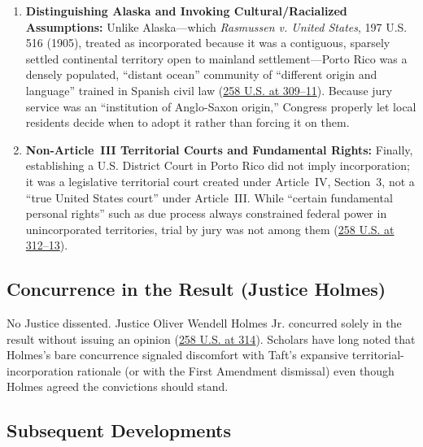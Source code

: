 \documentclass[12pt]{article}
\begin{document}
\begin{enumerate}
  \item \textbf{Distinguishing Alaska and Invoking Cultural/Racialized Assumptions:} Unlike Alaska---which \textit{Rasmussen v. United States}, 197 U.S. 516 (1905), treated as incorporated because it was a contiguous, sparsely settled continental territory open to mainland settlement---Porto Rico was a densely populated, ``distant ocean'' community of ``different origin and language'' trained in Spanish civil law (\href{https://en.wikisource.org/wiki/Balzac_v._Porto_Rico/Opinion_of_the_Court}{258 U.S. at 309--11}). Because jury service was an ``institution of Anglo-Saxon origin,'' Congress properly let local residents decide when to adopt it rather than forcing it on them.
  \item \textbf{Non-Article~III Territorial Courts and Fundamental Rights:} Finally, establishing a U.S. District Court in Porto Rico did not imply incorporation; it was a legislative territorial court created under Article~IV, Section~3, not a ``true United States court'' under Article~III. While ``certain fundamental personal rights'' such as due process always constrained federal power in unincorporated territories, trial by jury was not among them (\href{https://en.wikisource.org/wiki/Balzac_v._Porto_Rico/Opinion_of_the_Court}{258 U.S. at 312--13}).
\end{enumerate}

\subsection{Concurrence in the Result (Justice Holmes)}

No Justice dissented. Justice Oliver Wendell Holmes Jr. concurred solely in the result without issuing an opinion (\href{https://supreme.justia.com/cases/federal/us/258/298/}{258 U.S. at 314}). Scholars have long noted that Holmes's bare concurrence signaled discomfort with Taft's expansive territorial-incorporation rationale (or with the First Amendment dismissal) even though Holmes agreed the convictions should stand.

\subsection{Subsequent Developments}
\end{document}
